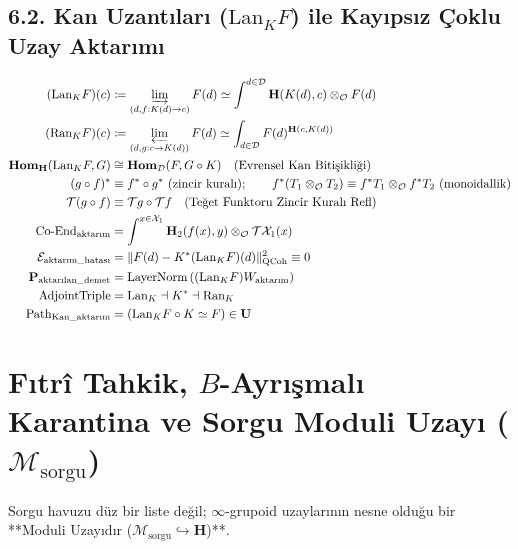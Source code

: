 \documentclass[11pt, a4paper]{article}
\begin{document}
\subsection{6.2. Kan Uzantıları ($\text{Lan}_K F$) ile Kayıpsız Çoklu Uzay Aktarımı}
\begin{align}
(\text{Lan}_K F)(c) &\coloneqq \varinjlim_{(d, f : K(d) \to c)} F(d) \simeq \int^{d \in \mathcal{D}} \mathbf{H}(K(d), c) \otimes_{\mathcal{O}} F(d) \\
(\text{Ran}_K F)(c) &\coloneqq \varprojlim_{(d, g : c \to K(d))} F(d) \simeq \int_{d \in \mathcal{D}} F(d)^{\mathbf{H}(c, K(d))} \\
\mathbf{Hom}_{\mathbf{H}}(\text{Lan}_K F, G) &\cong \mathbf{Hom}_{\mathcal{D}}(F, G \circ K) \quad (\text{Evrensel Kan Bitişikliği}) \\
(g \circ f)^* &\equiv f^* \circ g^* \ (\text{zincir kuralı}); \qquad f^*(T_1 \otimes_{\mathcal{O}} T_2) \equiv f^* T_1 \otimes_{\mathcal{O}} f^* T_2 \ (\text{monoidallik}) \\
\mathcal{T}(g \circ f) &\equiv \mathcal{T}g \circ \mathcal{T}f \quad (\text{Teğet Funktoru Zincir Kuralı Refl}) \\
\text{Co-End}_{\text{aktarım}} &= \int^{x \in \mathcal{X}_1} \mathbf{H}_2(f(x), y) \otimes_{\mathcal{O}} \mathcal{T}\mathcal{X}_1(x) \\
\mathcal{E}_{\text{aktarım\_hatası}} &= \| F(d) - K^* (\text{Lan}_K F)(d) \|_{\text{QCoh}}^2 \equiv 0 \\
\mathbf{P}_{\text{aktarılan\_demet}} &= \text{LayerNorm}\left( (\text{Lan}_K F) W_{\text{aktarım}} \right) \\
\text{AdjointTriple} &= \text{Lan}_K \dashv K^* \dashv \text{Ran}_K \\
\text{Path}_{\text{Kan\_aktarım}} &= (\text{Lan}_K F \circ K \simeq F) \in \mathbf{U}
\end{align}

\section{Fıtrî Tahkik, $B$-Ayrışmalı Karantina ve Sorgu Moduli Uzayı ($\mathcal{M}_{\text{sorgu}}$)}

Sorgu havuzu düz bir liste değil; $\infty$-grupoid uzaylarının nesne olduğu bir **Moduli Uzayıdır ($\mathcal{M}_{\text{sorgu}} \hookrightarrow \mathbf{H}$)**.
\end{document}
